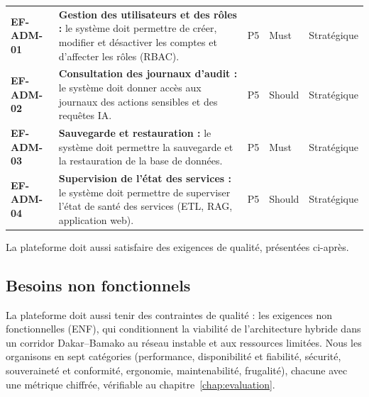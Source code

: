 \begin{longtable}{|>{\raggedright\arraybackslash}p{1.5cm}|>{\raggedright\arraybackslash}p{5.2cm}|>{\raggedright\arraybackslash}p{1.6cm}|>{\raggedright\arraybackslash}p{1.7cm}|>{\raggedright\arraybackslash}p{2.8cm}|}
\multicolumn{5}{|l|}{\cellcolor[HTML]{DDEBF7}\textbf{M6. Administration}} \\ \hline
\textbf{EF-ADM-01} & \textbf{Gestion des utilisateurs et des rôles :} le système doit permettre de créer, modifier et désactiver les comptes et d'affecter les rôles (RBAC). & P5 & Must & Stratégique \\ \hline
\textbf{EF-ADM-02} & \textbf{Consultation des journaux d'audit :} le système doit donner accès aux journaux des actions sensibles et des requêtes IA. & P5 & Should & Stratégique \\ \hline
\textbf{EF-ADM-03} & \textbf{Sauvegarde et restauration :} le système doit permettre la sauvegarde et la restauration de la base de données. & P5 & Must & Stratégique \\ \hline
\textbf{EF-ADM-04} & \textbf{Supervision de l'état des services :} le système doit permettre de superviser l'état de santé des services (ETL, RAG, application web). & P5 & Should & Stratégique \\ \hline
\end{longtable}

La plateforme doit aussi satisfaire des exigences de qualité, présentées ci-après.

\subsection{Besoins non fonctionnels}
\label{sec:besoins_non_fonctionnels}
La plateforme doit aussi tenir des contraintes de qualité : les exigences non fonctionnelles (ENF), qui conditionnent la viabilité de l'architecture hybride dans un corridor Dakar--Bamako au réseau instable et aux ressources limitées. Nous les organisons en sept catégories (performance, disponibilité et fiabilité, sécurité, souveraineté et conformité, ergonomie, maintenabilité, frugalité), chacune avec une métrique chiffrée, vérifiable au chapitre~\ref{chap:evaluation}.

